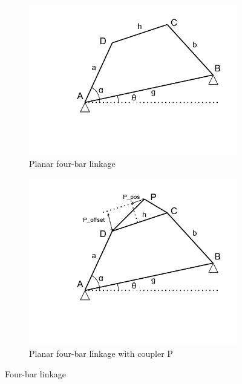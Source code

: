 \documentclass{article}
\begin{document}
\begin{figure}[h]
	\centering
	\begin{subfigure}{0.49\textwidth}
		\centering
	    \includegraphics[width=\linewidth]{./figures/four-bar_linkage.pdf}
	    \caption{Planar four-bar linkage}
	    \label{fig:linkage-1}
	\end{subfigure}
	\hfill
	\begin{subfigure}{0.49\textwidth}
		\centering
		\includegraphics[width=\linewidth]{./figures/four-bar_linkage+coupler.pdf}
		\caption{Planar four-bar linkage with coupler P}
		\label{fig:linkage-2}
	\end{subfigure}
	\caption{Four-bar linkage}
\end{figure}
\end{document}
